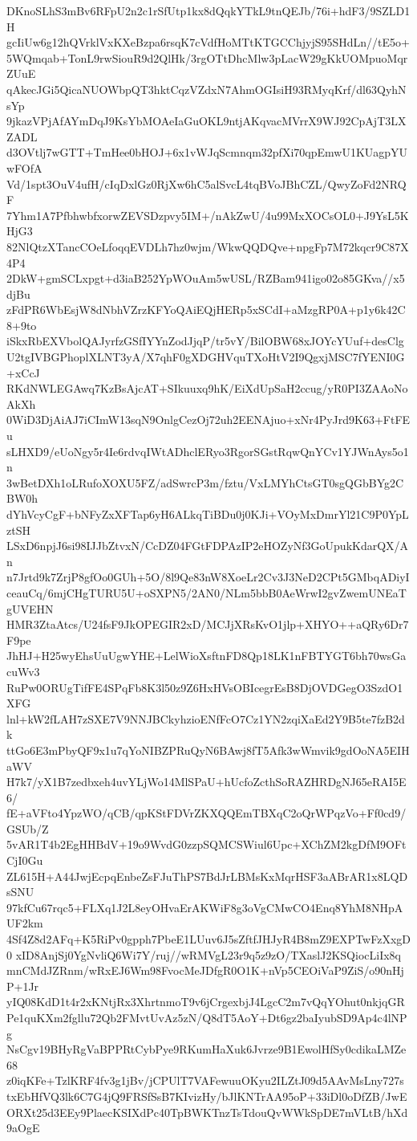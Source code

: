 DKnoSLhS3mBv6RFpU2n2c1rSfUtp1kx8dQqkYTkL9tnQEJb/76i+hdF3/9SZLD1H
gcIiUw6g12hQVrklVxKXeBzpa6rsqK7cVdfHoMTtKTGCChjyjS95SHdLn//tE5o+
5WQmqab+TonL9rwSiouR9d2QlHk/3rgOTtDhcMlw3pLacW29gKkUOMpuoMqrZUuE
qAkecJGi5QicaNUOWbpQT3hktCqzVZdxN7AhmOGIsiH93RMyqKrf/dl63QyhNsYp
9jkazVPjAfAYmDqJ9KsYbMOAeIaGuOKL9ntjAKqvacMVrrX9WJ92CpAjT3LXZADL
d3OVtlj7wGTT+TmHee0bHOJ+6x1vWJqScmnqm32pfXi70qpEmwU1KUagpYUwFOfA
Vd/1spt3OuV4ufH/cIqDxlGz0RjXw6hC5alSvcL4tqBVoJBhCZL/QwyZoFd2NRQF
7Yhm1A7PfbhwbfxorwZEVSDzpvy5IM+/nAkZwU/4u99MxXOCsOL0+J9YsL5KHjG3
82NlQtzXTancCOeLfoqqEVDLh7hz0wjm/WkwQQDQve+npgFp7M72kqcr9C87X4P4
2DkW+gmSCLxpgt+d3iaB252YpWOuAm5wUSL/RZBam941igo02o85GKva//x5djBu
zFdPR6WbEsjW8dNbhVZrzKFYoQAiEQjHERp5xSCdI+aMzgRP0A+p1y6k42C8+9to
iSkxRbEXVbolQAJyrfzGSfIYYnZodJjqP/tr5vY/BilOBW68xJOYcYUuf+desClg
U2tgIVBGPhoplXLNT3yA/X7qhF0gXDGHVquTXoHtV2I9QgxjMSC7fYENI0G+xCcJ
RKdNWLEGAwq7KzBsAjcAT+SIkuuxq9hK/EiXdUpSaH2ccug/yR0PI3ZAAoNoAkXh
0WiD3DjAiAJ7iCImW13sqN9OnlgCezOj72uh2EENAjuo+xNr4PyJrd9K63+FtFEu
sLHXD9/eUoNgy5r4Ie6rdvqIWtADhclERyo3RgorSGstRqwQnYCv1YJWnAys5o1n
3wBetDXh1oLRufoXOXU5FZ/adSwrcP3m/fztu/VxLMYhCtsGT0sgQGbBYg2CBW0h
dYhVcyCgF+bNFyZxXFTap6yH6ALkqTiBDu0j0KJi+VOyMxDmrYl21C9P0YpLztSH
LSxD6npjJ6si98IJJbZtvxN/CcDZ04FGtFDPAzIP2eHOZyNf3GoUpukKdarQX/An
n7Jrtd9k7ZrjP8gfOo0GUh+5O/8l9Qe83nW8XoeLr2Cv3J3NeD2CPt5GMbqADiyI
ceauCq/6mjCHgTURU5U+oSXPN5/2AN0/NLm5bbB0AeWrwI2gvZwemUNEaTgUVEHN
HMR3ZtaAtcs/U24fsF9JkOPEGIR2xD/MCJjXRsKvO1jlp+XHYO++aQRy6Dr7F9pe
JhHJ+H25wyEhsUuUgwYHE+LelWioXsftnFD8Qp18LK1nFBTYGT6bh70wsGacuWv3
RuPw0ORUgTifFE4SPqFb8K3l50z9Z6HxHVsOBIcegrEsB8DjOVDGegO3SzdO1XFG
lnl+kW2fLAH7zSXE7V9NNJBCkyhzioENfFcO7Cz1YN2zqiXaEd2Y9B5te7fzB2dk
ttGo6E3mPbyQF9x1u7qYoNIBZPRuQyN6BAwj8fT5Afk3wWmvik9gdOoNA5EIHaWV
H7k7/yX1B7zedbxeh4uvYLjWo14MlSPaU+hUcfoZcthSoRAZHRDgNJ65eRAI5E6/
fE+aVFto4YpzWO/qCB/qpKStFDVrZKXQQEmTBXqC2oQrWPqzVo+Ff0cd9/GSUb/Z
5vAR1T4b2EgHHBdV+19o9WvdG0zzpSQMCSWiul6Upc+XChZM2kgDfM9OFtCjI0Gu
ZL615H+A44JwjEcpqEnbeZsFJuThPS7BdJrLBMsKxMqrHSF3aABrAR1x8LQDsSNU
97kfCu67rqc5+FLXq1J2L8eyOHvaErAKWiF8g3oVgCMwCO4Enq8YhM8NHpAUF2km
4Sf4Z8d2AFq+K5RiPv0gpph7PbeE1LUuv6J5sZftfJHJyR4B8mZ9EXPTwFzXxgD0
xID8AnjSj0YgNvliQ6Wi7Y/ruj//wRMVgL23r9q5z9zO/TXaslJ2KSQiocLiIx8q
mnCMdJZRnm/wRxEJ6Wm98FvocMeJDfgR0O1K+nVp5CEOiVaP9ZiS/o90nHjP+1Jr
yIQ08KdD1t4r2xKNtjRx3XhrtnmoT9v6jCrgexbjJ4LgcC2m7vQqYOhut0nkjqGR
Pe1quKXm2fgllu72Qb2FMvtUvAz5zN/Q8dT5AoY+Dt6gz2baIyubSD9Ap4c4lNPg
NsCgv19BHyRgVaBPPRtCybPye9RKumHaXuk6Jvrze9B1EwolHfSy0cdikaLMZe68
z0iqKFe+TzlKRF4fv3g1jBv/jCPUlT7VAFewuuOKyu2ILZtJ09d5AAvMsLny727s
txEbHfVQ3lk6C7G4jQ9FRSfSsB7KIvizHy/bJlKNTrAA95oP+33iDl0oDfZB/JwE
ORXt25d3EEy9PlaecKSIXdPc40TpBWKTnzTsTdouQvWWkSpDE7mVLtB/hXd9aOgE
